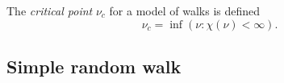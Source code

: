 The \emph{critical point} $\nu_c$ for a model of walks is defined
\begin{equation}
\nu_c = \inf (\nu : \chi(\nu) < \infty).
\end{equation}




\subsection{Simple random walk}



